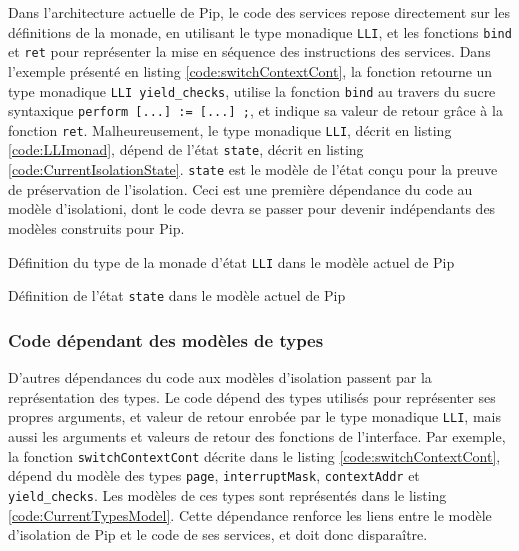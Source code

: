 			Dans l'architecture actuelle de Pip, le code des services repose directement sur les définitions de la monade, en utilisant le type monadique \texttt{LLI}, et les fonctions \texttt{bind} et \texttt{ret} pour représenter la mise en séquence des instructions des services. Dans l'exemple présenté en listing \ref{code:switchContextCont}, la fonction retourne un type monadique \texttt{LLI yield\_checks}, utilise la fonction \texttt{bind} au travers du sucre syntaxique \texttt{perform [...] := [...] ;}, et indique sa valeur de retour grâce à la fonction \texttt{ret}.
			Malheureusement, le type monadique \texttt{LLI}, décrit en listing \ref{code:LLImonad}, dépend de l'état \texttt{state}, décrit en listing \ref{code:CurrentIsolationState}. \texttt{state} est le modèle de l'état conçu pour la preuve de préservation de l'isolation. Ceci est une première dépendance du code au modèle d'isolationi, dont le code devra se passer pour devenir indépendants des modèles construits pour Pip.

			\begin{listing}[!ht]
				\caption{Définition du type de la monade d'état \texttt{LLI} dans le modèle actuel de Pip}
				\label{code:LLImonad}
			\end{listing}

			\begin{listing}[!ht]
				\caption{Définition de l'état \texttt{state} dans le modèle actuel de Pip}
				\label{code:CurrentIsolationState}
			\end{listing}

			\subsubsection{Code dépendant des modèles de types}

			D'autres dépendances du code aux modèles d'isolation passent par la représentation des types. Le code dépend des types utilisés pour représenter ses propres arguments, et valeur de retour enrobée par le type monadique \texttt{LLI}, mais aussi les arguments et valeurs de retour des fonctions de l'interface. Par exemple, la fonction \texttt{switchContextCont} décrite dans le listing \ref{code:switchContextCont}, dépend du modèle des types \texttt{page}, \texttt{interruptMask}, \texttt{contextAddr} et \texttt{yield\_checks}. Les modèles de ces types sont représentés dans le listing \ref{code:CurrentTypesModel}.
Cette dépendance renforce les liens entre le modèle d'isolation de Pip et le code de ses services, et doit donc disparaître.

